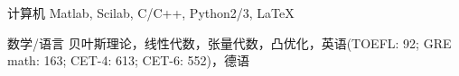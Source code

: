 


\begin{cvskills}


\cvskill
{计算机} %
{Matlab, Scilab, C/C++, Python2/3, LaTeX} %


\cvskill
{数学/语言} %
{贝叶斯理论，线性代数，张量代数，凸优化，英语(TOEFL: 92; GRE math: 163; CET-4: 613; CET-6: 552)，德语} %



\end{cvskills}
